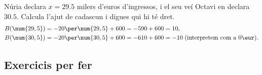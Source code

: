 \begin{exresolt}
Núria declara $x=\num{29,5}$ milers d'euros d'ingressos, i el seu veí Octavi
en declara $\num{30,5}$. Calcula l'ajut de cadascun i digues qui hi té dret.
\solucio
\begin{align*}
B(\num{29,5})&=-20\per\num{29,5}+600=-590+600=10,\\
B(\num{30,5})&=-20\per\num{30,5}+600=-610+600=-10
   \;\text{(interpretem com a $0\eur$)}.
\end{align*}
\end{exresolt}

\subsection{Exercicis per fer}

